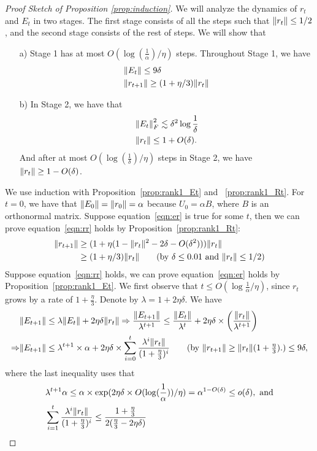 \begin{proof}[Proof Sketch of Proposition \ref{prop:induction}]
	We will analyze the dynamics of $r_t$ and $E_t$ in two stages.
	The first stage consists of all the steps such that $\left\|r_t\right\|\le 1/2$,
	and the second stage consists of the rest of steps.  We will show that
	\begin{enumerate}
		\item[a)] Stage 1 has at most $O(\log(\frac 1 {\alpha})/\eta)$ steps.
		Throughout Stage 1, we have
		\begin{align}
			&	\|E_t\|\le 9\delta \label{eqn:er} \\
			&	\|r_{t+1}\|\ge (1+\eta/3)\|r_t\| \label{eqn:rr}
		\end{align}
		\item[b)] In Stage 2, we have that 
		\begin{align*}
			& \left\|E_t\right\|^2_F \lesssim \delta^2\log{\frac 1{\delta}} \\
			& \left\|r_t\right\|\le 1+O(\delta).
		\end{align*}
		And after at most $O(\log(\frac 1 {\delta})/\eta)$ steps in Stage 2, we have $\left\|r_t\right\|\ge 1-O(\delta)$. 
	\end{enumerate}

	We use induction with Proposition~\ref{prop:rank1_Et} and ~\ref{prop:rank1_Rt}. For $t=0$, we have that $\|E_0\| = \|r_0\| = \alpha$ because $U_0 = \alpha B$, where $B$ is an orthonormal matrix. Suppose equation~\eqref{eqn:er} is true for some $t$, then we can prove equation~\eqref{eqn:rr} holds by Proposition~\ref{prop:rank1_Rt}:
	\begin{align*}
		\bignorm{r_{t+1}} & \ge   (1 + \eta (1 - \norm{r_t}^2 - 2\delta - O(\delta^2)))\norm{ r_t} \\
		& \ge (1+\eta/3)\norm{r_t}	\tag{by $\delta \le 0.01$ and $\Norm{r_t}\le 1/2$}
	\end{align*}
	Suppose equation~\eqref{eqn:rr} holds, we can prove equation~\eqref{eqn:er} holds by Proposition~\ref{prop:rank1_Et}.
	We first observe that $t \le O(\log{\frac 1 {\alpha}} / \eta)$,
	since $r_t$ grows by a rate of $1 + \frac{\eta} 3$.
	Denote by $\lambda = 1 + 2\eta\delta$. We have
	\begin{align*}
		& \norm{E_{t+1}} \le \lambda \norm{E_t} + 2\eta\delta \norm{r_t}
		\Rightarrow \frac {\norm{E_{t+1}}} {{\lambda}^{t+1}} \le \frac{\norm{E_t}}{{\lambda}^t} + 2\eta\delta \times \left(\frac{\norm{r_t}} {{\lambda}^{t+1}} \right) \\
		\Rightarrow & \norm{E_{t+1}} \le {\lambda}^{t+1} \times \alpha +
		2\eta\delta \times \sum_{i=0}^t \frac{\lambda^i \norm{r_t}}{(1+\frac{\eta}3)^i} \tag{by $\norm{r_{t+1}} \ge \norm{r_t} (1 + \frac {\eta} 3)$.}
		\le 9\delta,
	\end{align*}
	where the last inequality uses that
	\begin{align*}
		& \lambda^{t+1} \alpha \le \alpha \times \exp(2\eta\delta \times O(\log(\frac 1 {\alpha})) / \eta) = \alpha^{1 - O(\delta)} \le o(\delta), \mbox{ and} \\
		& \sum_{i=1}^t \frac{\lambda^i \|r_t\|}{(1+\frac{\eta}3)^i} \le \frac{1 + \frac{\eta}3}{2 (\frac{\eta}3 - 2\eta\delta)}
	\end{align*}


\end{proof}
